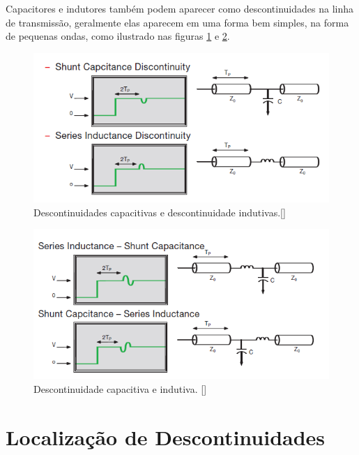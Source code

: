 Capacitores e indutores também podem aparecer como descontinuidades na linha de transmissão, geralmente elas aparecem em uma forma bem simples, na forma de pequenas ondas, como ilustrado nas figuras \ref{fig:descontinuidade_C_L} e \ref{fig:Descontinuidade_CL}.


\begin{figure}
	\begin{center}
		 \includegraphics[scale=.5]{./cap2/figuras/C_L_descontinuidade.png}
		 \caption{Descontinuidades capacitivas e descontinuidade indutivas.[\cite{TDK2}]}
		 \label{fig:descontinuidade_C_L}
	\end{center}
\end{figure}


\begin{figure}
	\begin{center}
		 \includegraphics[scale=.5]{./cap2/figuras/CL_descontinuidade.png}
		 \caption{Descontinuidade capacitiva e indutiva. [\cite{TDK2}]}
		 \label{fig:Descontinuidade_CL}
	\end{center}
\end{figure}


\section{Localização de Descontinuidades}

